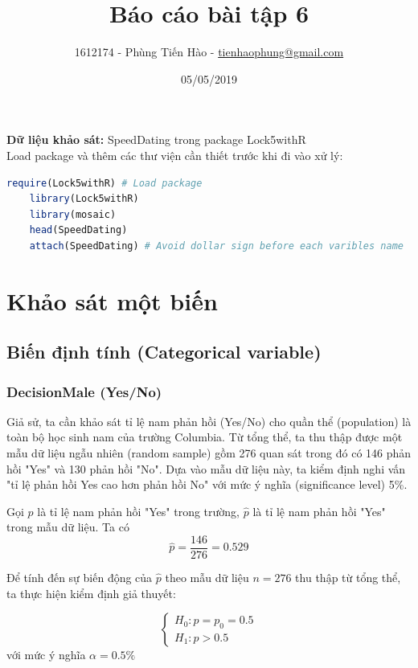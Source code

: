 \documentclass[a4paper,12pt]{article}
\title{Báo cáo bài tập 6}
\author{1612174 - Phùng Tiến Hào - \href{mailto:tienhaophung@gmail.com}{tienhaophung@gmail.com}}
\date{05/05/2019}
\begin{document}
	\maketitle
	\newpage
	
	\doublespacing
	\tableofcontents
	\singlespace
	
	\newpage
	
	\textbf{Dữ liệu khảo sát:} SpeedDating trong package Lock5withR\\
	
	Load package và thêm các thư viện cần thiết trước khi đi vào xử lý:
	\begin{lstlisting}[language=R]
	require(Lock5withR) # Load package
	library(Lock5withR)
	library(mosaic)
	head(SpeedDating)
	attach(SpeedDating) # Avoid dollar sign before each varibles name
	\end{lstlisting}
	\section{Khảo sát một biến}
	\subsection{Biến định tính (Categorical variable)}
	\subsubsection{DecisionMale (Yes/No)}
	Giả sử, ta cần khảo sát tỉ lệ nam phản hồi (Yes/No) cho quần thể (population) là toàn bộ học sinh nam của trường Columbia. Từ tổng thể, ta thu thập được một mẫu dữ liệu ngẫu nhiên (random sample) gồm 276 quan sát trong đó có 146 phản hồi "Yes" và 130 phản hồi "No". Dựa vào mẫu dữ liệu này, ta kiểm định nghi vấn "tỉ lệ phản hồi Yes cao hơn phản hồi No" với mức ý nghĩa (significance level) 5\%.
	
	Gọi $p$ là tỉ lệ nam phản hồi "Yes" trong trường, $\hat{p}$ là tỉ lệ nam phản hồi "Yes" trong mẫu dữ liệu. Ta có
	$$\hat{p} = \frac{146}{276} = 0.529$$
	
	Để tính đến sự biến động của $\hat{p}$ theo mẫu dữ liệu $n = 276$ thu thập từ tổng thể, ta thực hiện kiểm định giả thuyết:
	
	\begin{equation*}
		\begin{cases}
		H_0: p = p_0 = 0.5\\
		H_1: p > 0.5
		\end{cases}
	\end{equation*}
	với mức ý nghĩa $\alpha = 0.5\%$
		
\end{document}
